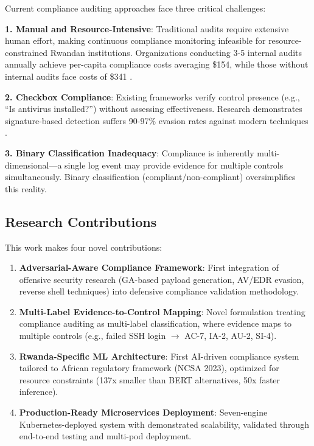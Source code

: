 \documentclass[11pt,conference]{IEEEtran}
\begin{document}
Current compliance auditing approaches face three critical challenges:

\textbf{1. Manual and Resource-Intensive}: Traditional audits require extensive human effort, making continuous compliance monitoring infeasible for resource-constrained Rwandan institutions. Organizations conducting 3-5 internal audits annually achieve per-capita compliance costs averaging \$154, while those without internal audits face costs of \$341 \cite{ponemon_cost}.

\textbf{2. Checkbox Compliance}: Existing frameworks verify control presence (e.g., ``Is antivirus installed?'') without assessing effectiveness. Research demonstrates signature-based detection suffers 90-97\% evasion rates against modern techniques \cite{dp_payload_paper, reverse_shell_paper}.

\textbf{3. Binary Classification Inadequacy}: Compliance is inherently multi-dimensional---a single log event may provide evidence for multiple controls simultaneously. Binary classification (compliant/non-compliant) oversimplifies this reality.

\subsection{Research Contributions}

This work makes four novel contributions:

\begin{enumerate}
    \item \textbf{Adversarial-Aware Compliance Framework}: First integration of offensive security research (GA-based payload generation, AV/EDR evasion, reverse shell techniques) into defensive compliance validation methodology.

    \item \textbf{Multi-Label Evidence-to-Control Mapping}: Novel formulation treating compliance auditing as multi-label classification, where evidence maps to multiple controls (e.g., failed SSH login $\rightarrow$ AC-7, IA-2, AU-2, SI-4).

    \item \textbf{Rwanda-Specific ML Architecture}: First AI-driven compliance system tailored to African regulatory framework (NCSA 2023), optimized for resource constraints (137x smaller than BERT alternatives, 50x faster inference).

    \item \textbf{Production-Ready Microservices Deployment}: Seven-engine Kubernetes-deployed system with demonstrated scalability, validated through end-to-end testing and multi-pod deployment.
\end{enumerate}
\end{document}
